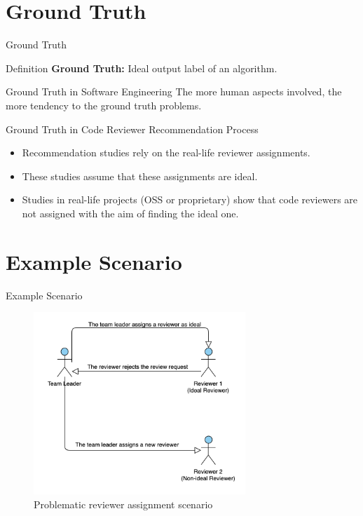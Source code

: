 \documentclass{beamer}
\begin{document}
%
%
\section{Ground Truth}
\begin{frame}{Ground Truth}
    \begin{block}{Definition}
    \textbf{Ground Truth:} Ideal output label of an algorithm. 
    \end{block}

    \begin{block}{Ground Truth in Software Engineering}
    The more human aspects involved, the more tendency to the ground truth problems.  
    \end{block}
    
    \begin{block}{Ground Truth in Code Reviewer Recommendation Process}
    \begin{itemize}
        \item Recommendation studies rely on the real-life reviewer assignments.
        \item These studies assume that these assignments are ideal. 
        \item Studies in real-life projects (OSS or proprietary) show that code reviewers are not assigned with the aim of finding the ideal one.
    \end{itemize}
    \end{block}
\end{frame}
%
%
\section{Example Scenario}
\begin{frame}{Example Scenario}
    \begin{figure}
    \includegraphics[width=8cm]{img/scenario.png}
    \caption{\label{fig:your-figure}Problematic reviewer assignment scenario}
    \end{figure}
\end{frame}
\end{document}
